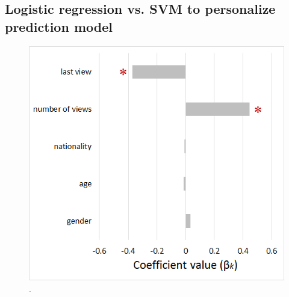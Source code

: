 \documentclass[sigconf]{acmart}
\begin{document}
\subsection{Logistic regression vs. SVM to personalize prediction model}

\begin{figure}[!htbp]
	\centering
	\includegraphics[width=\columnwidth]{figures/Logistic_regression.png}
	\caption{\label{fig:logistic_regression}.}
\end{figure}



%


\end{document}
